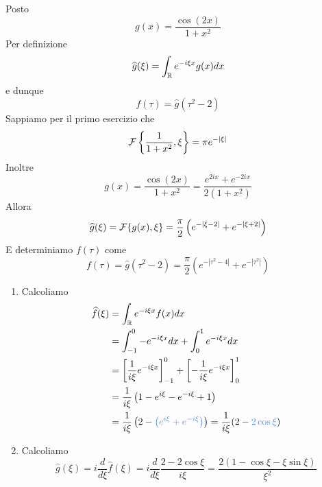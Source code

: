 Posto
\begin{equation*}
g( x) =\frac{\cos( 2x)}{1+x^{2}}
\end{equation*}
Per definizione
\begin{equation*}
\widehat{g}( \xi ) =\int _{\mathbb{R} } e^{-i\xi x} g( x) dx
\end{equation*}
e dunque
\begin{equation*}
f( \tau ) =\hat{g}\left( \tau ^{2} -2\right)
\end{equation*}
Sappiamo per il primo esercizio che
\begin{equation*}
\mathcal{F} \left\{\frac{1}{1+x^{2}} ,\xi \right\} =\pi e^{-| \xi | }
\end{equation*}
Inoltre
\begin{equation*}
g( x) =\frac{\cos( 2x)}{1+x^{2}} =\frac{e^{2ix} +e^{-2ix}}{2\left( 1+x^{2}\right)}
\end{equation*}
Allora
\begin{equation*}
\widehat{g}( \xi ) =\mathcal{F} \{g( x) ,\xi \} =\frac{\pi }{2}\left( e^{-| \xi -2| } +e^{-| \xi +2| }\right)
\end{equation*}
E determiniamo $f( \tau )$ come
\begin{equation*}
f( \tau ) =\hat{g}\left( \tau ^{2} -2\right) =\frac{\pi }{2}\left( e^{-\left| \tau ^{2} -4\right| } +e^{-\left| \tau ^{2}\right| }\right)
\end{equation*}
\Soluzione
\begin{enumerate}
\item Calcoliamo\begin{equation*}
\begin{aligned}
\hat{f}( \xi ) & =\int _{\RR } e^{-i\xi x} f( x) dx\\
 & =\int ^{0}_{-1} -e^{-i\xi x} dx+\int ^{1}_{0} e^{-i\xi x} dx\\
 & =\left[\frac{1}{i\xi } e^{-i\xi x}\right]^{0}_{-1} +\left[ -\frac{1}{i\xi } e^{-i\xi x}\right]^{1}_{0}\\
 & =\frac{1}{i\xi }\left( 1-e^{i\xi } -e^{-i\xi } +1\right)\\
 & =\frac{1}{i\xi }\left( 2-\textcolor[rgb]{0.29,0.56,0.89}{\left(e^{i\xi }+e^{-i\xi }\right)}\right) =\frac{1}{i\xi }( 2-\textcolor[rgb]{0.29,0.56,0.89}{2\cos\xi })
\end{aligned}
\end{equation*}
\item Calcoliamo\begin{equation*}
\hat{g}( \xi ) =i\frac{d}{d\xi }\hat{f}( \xi ) =i\frac{d}{d\xi }\frac{2-2\cos \xi }{i\xi } =\frac{2( 1-\cos \xi -\xi \sin \xi )}{\xi ^{2}}
\end{equation*}
\end{enumerate}
\Soluzione

